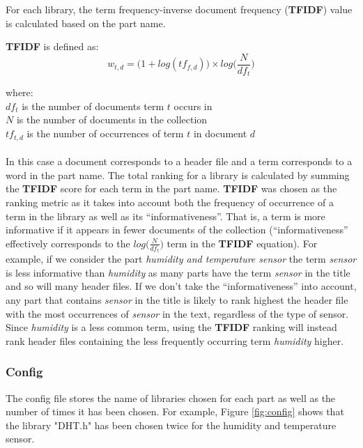 \documentclass{UoYCSproject}
\newcommand\tab[1][1cm]{\hspace*{#1}}
\begin{document}
For each library, the term frequency-inverse document frequency (\textbf{TFIDF}) value is calculated based on the part name. 

\textbf{TFIDF} is defined as:
\begin{equation}
w_{t,d} = \big(1 + log(tf_{f,d})\big) \times log\bigg(\frac{N}{df_t}\bigg)
\end{equation}

where:\\
\tab$df_t$ is the number of documents term $t$ occurs in\\
\tab$N$ is the number of documents in the collection\\
\tab$tf_{t,d}$ is the number of occurrences of term $t$ in document $d$\\
\\
In this case a document corresponds to a header file and a term corresponds to a word in the part name. The total ranking for a library is calculated by summing the \textbf{TFIDF} score for each term in the part name.
\textbf{TFIDF} was chosen as the ranking metric as it takes into account both the frequency of occurrence of a term in the library as well as its ``informativeness''. That is, a term is more informative if it appears in fewer documents of the collection (``informativeness'' effectively corresponds to the $log\Big(\frac{N}{df_t}\Big)$ term in the \textbf{TFIDF} equation). For example, if we consider the part \textit{humidity and temperature sensor} the term \textit{sensor} is less informative than \textit{humidity} as many parts have the term \textit{sensor} in the title and so will many header files. If we don't take the ``informativeness'' into account, any part that contains \textit{sensor} in the title is likely to rank highest the header file with the most occurrences of \textit{sensor} in the text, regardless of the type of sensor. Since \textit{humidity} is a less common term, using the \textbf{TFIDF} ranking will instead rank header files containing the less frequently occurring term \textit{humidity} higher.

\subsubsection{Config}
The config file stores the name of libraries chosen for each part as well as the number of times it has been chosen. For example, Figure \ref{fig:config} shows that the library "DHT.h" has been chosen twice for the humidity and temperature sensor.
\end{document}
